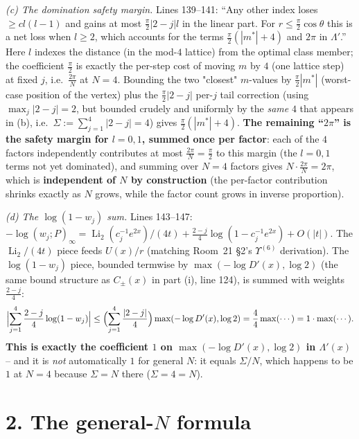 \documentclass[11pt]{article}
\begin{document}
\emph{(c) The domination safety margin.} Lines 139--141: ``Any other index loses $\ge cl(l-1)$ and
gains at most $\frac\pi2|2-j|l$ in the linear part. For $r\le\frac\pi2\cos\theta$ this is a net
loss when $l\ge2$, which accounts for the terms $\frac\pi2(|m^\ast|+4)$ and $2\pi$ in $\Lambda'$.''
Here $l$ indexes the distance (in the mod-$4$ lattice) from the optimal class member; the
coefficient $\frac\pi2$ is exactly the per-step cost of moving $m$ by $4$ (one lattice step) at
fixed $j$, i.e.\ $\frac{2\pi}{N}$ at $N=4$. Bounding the two "closest" $m$-values by
$\frac\pi2|m^\ast|$ (worst-case position of the vertex) plus the $\frac\pi2|2-j|$ per-$j$ tail
correction (using $\max_j|2-j|=2$, but bounded crudely and uniformly by the \emph{same} $4$ that
appears in (b), i.e.\ $\Sigma:=\sum_{j=1}^4|2-j|=4$) gives $\frac\pi2(|m^\ast|+4)$. \textbf{The
remaining ``$2\pi$'' is the safety margin for $l=0,1$, summed once per factor}: each of the $4$
factors independently contributes at most $\frac{2\pi}N=\frac\pi2$ to this margin (the $l=0,1$
terms not yet dominated), and summing over $N=4$ factors gives $N\cdot\frac{2\pi}N=2\pi$, which is
\textbf{independent of $N$ by construction} (the per-factor contribution shrinks exactly as $N$
grows, while the factor count grows in inverse proportion).

\emph{(d) The $\log(1-w_j)$ sum.} Lines 143--147: $-\log(w_j;P)_\infty=\operatorname{Li}_2(c_j^{-1}
e^{2x})/(4t)+\frac{2-j}4\log(1-c_j^{-1}e^{2x})+O(|t|)$. The $\operatorname{Li}_2/(4t)$ piece feeds
$U(x)/r$ (matching Room~21 \S2's $\Upsilon^{(6)}$ derivation). The $\log(1-w_j)$ piece, bounded
termwise by $\max(-\log D'(x),\log2)$ (the same bound structure as $C_\pm(x)$ in part (i), line
124), is summed with weights $\frac{2-j}4$:
\[
 \Bigl|\sum_{j=1}^4\frac{2-j}4\log(1-w_j)\Bigr|\le\Bigl(\sum_{j=1}^4\frac{|2-j|}4\Bigr)
 \max(-\log D'(x),\log2)=\frac44\max(\cdots)=1\cdot\max(\cdots).
\]
\textbf{This is exactly the coefficient $1$ on $\max(-\log D'(x),\log2)$ in $\Lambda'(x)$} -- and
it is \emph{not} automatically $1$ for general $N$: it equals $\Sigma/N$, which happens to be $1$
at $N=4$ because $\Sigma=N$ there ($\Sigma=4=N$).

\section*{2. The general-$N$ formula}
\end{document}
